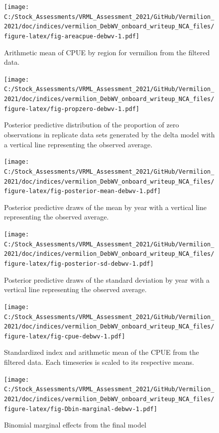 \documentclass[11pt,
  english,
  a4paper,
]{article}
\begin{document}
\begin{figure}
\centering
\texttt{[image: C:/Stock\_Assessments/VRML\_Assessment\_2021/GitHub/Vermilion\_2021/doc/indices/vermilion\_DebWV\_onboard\_writeup\_NCA\_files/figure-latex/fig-areacpue-debwv-1.pdf]}
\caption{\label{fig:fig-areacpue-debwv}Arithmetic mean of CPUE by region for vermilion from the filtered data.}
\end{figure}

\begin{figure}
\centering
\texttt{[image: C:/Stock\_Assessments/VRML\_Assessment\_2021/GitHub/Vermilion\_2021/doc/indices/vermilion\_DebWV\_onboard\_writeup\_NCA\_files/figure-latex/fig-propzero-debwv-1.pdf]}
\caption{\label{fig:fig-propzero-debwv}Posterior predictive distribution of the proportion of zero observations in replicate data sets generated by the delta model with a vertical line representing the observed average.}
\end{figure}

\begin{figure}
\centering
\texttt{[image: C:/Stock\_Assessments/VRML\_Assessment\_2021/GitHub/Vermilion\_2021/doc/indices/vermilion\_DebWV\_onboard\_writeup\_NCA\_files/figure-latex/fig-posterior-mean-debwv-1.pdf]}
\caption{\label{fig:fig-posterior-mean-debwv}Posterior predictive draws of the mean by year with a vertical line representing the observed average.}
\end{figure}

\begin{figure}
\centering
\texttt{[image: C:/Stock\_Assessments/VRML\_Assessment\_2021/GitHub/Vermilion\_2021/doc/indices/vermilion\_DebWV\_onboard\_writeup\_NCA\_files/figure-latex/fig-posterior-sd-debwv-1.pdf]}
\caption{\label{fig:fig-posterior-sd-debwv}Posterior predictive draws of the standard deviation by year with a vertical line representing the observed average.}
\end{figure}

\begin{figure}
\centering
\texttt{[image: C:/Stock\_Assessments/VRML\_Assessment\_2021/GitHub/Vermilion\_2021/doc/indices/vermilion\_DebWV\_onboard\_writeup\_NCA\_files/figure-latex/fig-cpue-debwv-1.pdf]}
\caption{\label{fig:fig-cpue-debwv}Standardized index and arithmetic mean of the CPUE from the filtered data. Each timeseries is scaled to its respective means.}
\end{figure}

\begin{figure}
\centering
\texttt{[image: C:/Stock\_Assessments/VRML\_Assessment\_2021/GitHub/Vermilion\_2021/doc/indices/vermilion\_DebWV\_onboard\_writeup\_NCA\_files/figure-latex/fig-Dbin-marginal-debwv-1.pdf]}
\caption{\label{fig:fig-Dbin-marginal-debwv}Binomial marginal effects from the final model}
\end{figure}
\end{document}
